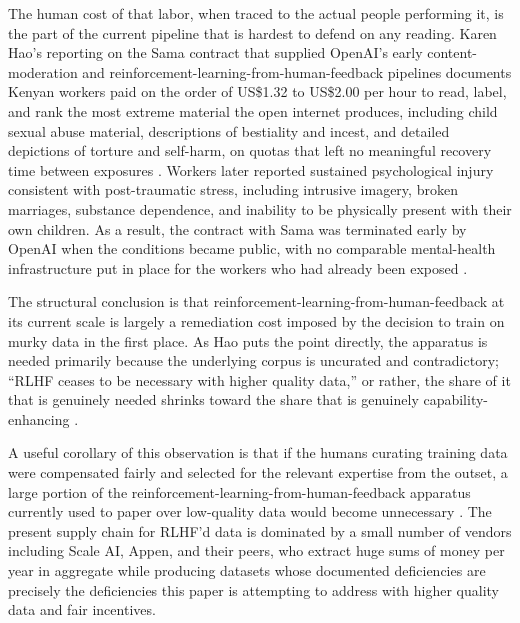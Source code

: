 \documentclass[10pt,a4paper,twocolumn]{article}
\begin{document}
The human cost of that labor, when traced to the actual people performing it, is the part of the current pipeline that is hardest to defend on any reading. Karen Hao's reporting on the Sama contract that supplied OpenAI's early content-moderation and reinforcement-learning-from-human-feedback pipelines documents Kenyan workers paid on the order of US\$1.32 to US\$2.00 per hour to read, label, and rank the most extreme material the open internet produces, including child sexual abuse material, descriptions of bestiality and incest, and detailed depictions of torture and self-harm, on quotas that left no meaningful recovery time between exposures \citep[ch.~9]{hao2025empire}. Workers later reported sustained psychological injury consistent with post-traumatic stress, including intrusive imagery, broken marriages, substance dependence, and inability to be physically present with their own children. As a result, the contract with Sama was terminated early by OpenAI when the conditions became public, with no comparable mental-health infrastructure put in place for the workers who had already been exposed \citep[ch.~9]{hao2025empire}.

The structural conclusion is that reinforcement-learning-from-human-feedback at its current scale is largely a remediation cost imposed by the decision to train on murky data in the first place. As Hao puts the point directly, the apparatus is needed primarily because the underlying corpus is uncurated and contradictory; ``RLHF ceases to be necessary with higher quality data,'' or rather, the share of it that is genuinely needed shrinks toward the share that is genuinely capability-enhancing \citep[p.~245]{hao2025empire}.

A useful corollary of this observation is that if the humans curating training data were compensated fairly and selected for the relevant expertise from the outset, a large portion of the reinforcement-learning-from-human-feedback apparatus currently used to paper over low-quality data would become unnecessary \citep[p.~245]{hao2025empire}. The present supply chain for RLHF'd data is dominated by a small number of vendors including Scale AI, Appen, and their peers, who extract huge sums of money per year in aggregate while producing datasets whose documented deficiencies are precisely the deficiencies this paper is attempting to address with higher quality data and fair incentives.
\end{document}
